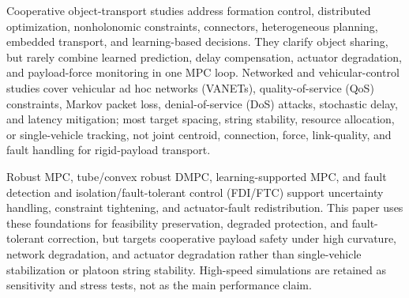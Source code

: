 \documentclass[twocolumn,3p,times,procedia]{elsarticle}
\begin{document}
Cooperative object-transport studies address formation control, distributed optimization, nonholonomic constraints, connectors, heterogeneous planning, embedded transport, and learning-based decisions\cite{an2023multiRobotCommTransport,cooperativeTransport2024ras,gong2023sixDofTransport,zhang2024heterogeneousTransport,embeddedFormationTransport2024cep,multiObjectiveTransport2024mechatronics,intelligentCollaborativeTransport2024}. They clarify object sharing, but rarely combine learned prediction, delay compensation, actuator degradation, and payload-force monitoring in one MPC loop. Networked and vehicular-control studies cover vehicular ad hoc networks (VANETs), quality-of-service (QoS) constraints, Markov packet loss, denial-of-service (DoS) attacks, stochastic delay, and latency mitigation\cite{tan2022mlVehicularDcn,zhao2025blockchainVanetDcn,wu2025drlVecDcn,bian2025markovPacketLossDMPC,dosDMPC2024isa,robustCommunicationLoss2025trb,bai2023robustLongitudinalDMPC,bao2024robustUkfMpc,networkLatencyCav2024sensors,dai2024networkedPredictiveControl}; most target spacing, string stability, resource allocation, or single-vehicle tracking, not joint centroid, connection, force, link-quality, and fault handling for rigid-payload transport.

Robust MPC, tube/convex robust DMPC, learning-supported MPC, and fault detection and isolation/fault-tolerant control (FDI/FTC) support uncertainty handling, constraint tightening, and actuator-fault redistribution\cite{mayne2000constrainedMpc,mayne2005robustMpc,convexRobustDMPC2025ejc,gasparino2023nnMpcUncertainty,liu2024adaptiveFtcSbw,xu2024fdFtcSteering}. This paper uses these foundations for feasibility preservation, degraded protection, and fault-tolerant correction, but targets cooperative payload safety under high curvature, network degradation, and actuator degradation rather than single-vehicle stabilization or platoon string stability. High-speed simulations are retained as sensitivity and stress tests, not as the main performance claim.
\end{document}

